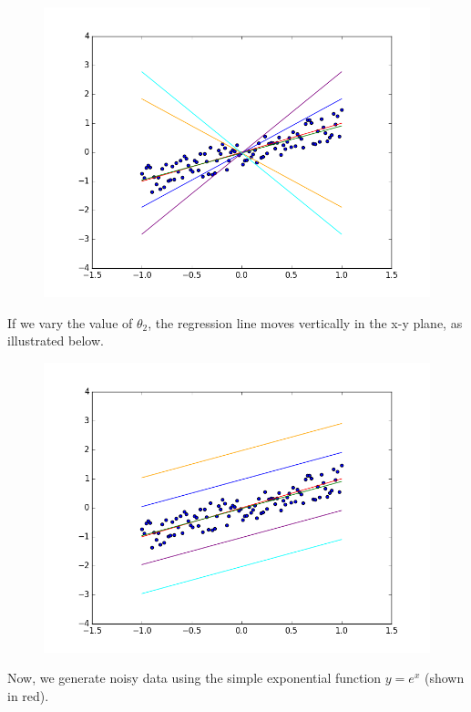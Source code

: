\documentclass[10pt]{article}
\begin{document}
\begin{figure}[H]
\includegraphics[scale=0.4]{linearNoiseVariationT1.png}
\end{figure}
If we vary the value of $\theta_{2}$, the regression line moves vertically in the x-y plane, as illustrated below.
\begin{figure}[H]
\includegraphics[scale=0.4]{linearNoiseVariationT2.png}
\end{figure}
\newpage
Now, we generate noisy data using the simple exponential function $y = e^x$ (shown in red).
\end{document}
